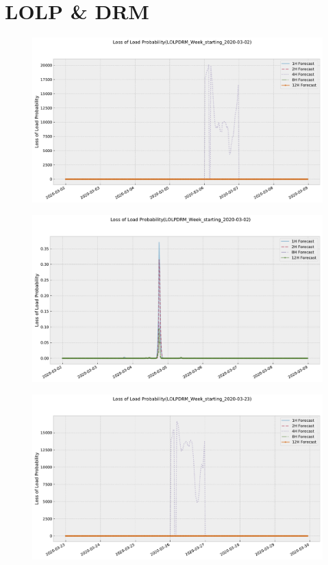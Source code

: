 \documentclass[energies,article,submit,moreauthors,pdftex]{Definitions/mdpi}
\begin{document}
\section{LOLP \& DRM}

\begin{figure}[H]\centering
\hspace{-25pt}\includegraphics[width=15 cm]{Graphics/LOLPDRM_Week_starting_2020-03-02.pdf}
\caption{}\label{}
\end{figure}  
\begin{figure}[H]\centering
\hspace{-25pt}\includegraphics[width=15 cm]{Graphics/LOLPDRM_Week_starting_2020-03-02no4H.pdf}
\caption{}\label{}
\end{figure}  
\begin{figure}[H]\centering
\hspace{-25pt}\includegraphics[width=15 cm]{Graphics/LOLPDRM_Week_starting_2020-03-23.pdf}
\caption{}\label{}
\end{figure}  
\end{document}
